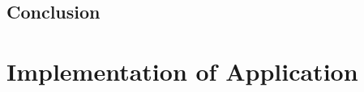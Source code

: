 \documentclass[11pt,a4paper]{article}
\begin{document}
\subsection{Conclusion}

\clearpage



\section{Implementation of Application}

\end{document}

